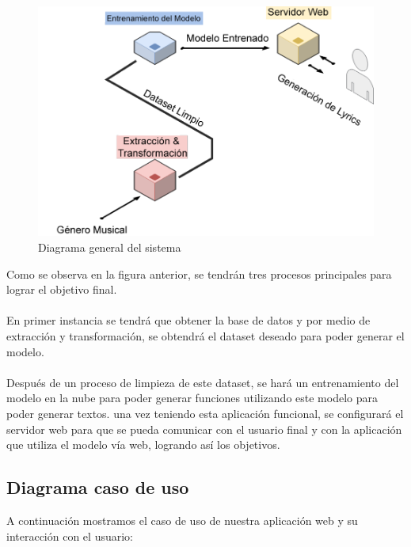 \documentclass[12pt, a4paper, titlepage]{report}
\begin{document}
		\begin{figure}[H] 
			\includegraphics[scale=.4]{./imagenes/Disenio/Arquitectura/general.png}
			\caption{Diagrama general del sistema}
		\end{figure}
		Como se observa en la figura anterior, se tendrán tres procesos principales para lograr el objetivo final.\\\\
		En primer instancia se tendrá que obtener la base de datos y por medio de extracción y transformación, se obtendrá el dataset deseado para poder generar el modelo. \\\\
		Después de un proceso de limpieza de este dataset, se hará un entrenamiento del modelo en la nube para poder generar funciones utilizando este modelo para poder generar textos.
		una vez teniendo esta aplicación funcional, se configurará el servidor web para que se pueda comunicar con el usuario final y con la aplicación que utiliza el modelo vía web, logrando así los objetivos.
	
		\subsection{Diagrama caso de uso}
		
		A continuación mostramos el caso de uso de nuestra aplicación web y su interacción con el usuario:
		
\end{document}
